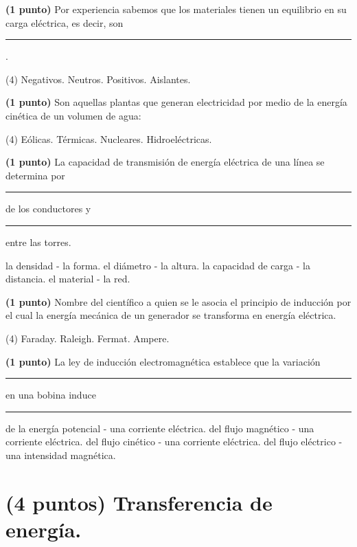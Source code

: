 \documentclass[12pt, letter]{exam}
\begin{document}
\begin{questions}
    \question\textbf{(1 punto)} Por experiencia sabemos que los materiales tienen un equilibrio en su carga eléctrica, es decir, son \rule{2cm}{0.1mm}.
    \begin{tasks}(4)
        \task Negativos.
        \task Neutros.
        \task Positivos.
        \task Aislantes.
    \end{tasks}
    \question\textbf{(1 punto)} Son aquellas plantas que generan electricidad por medio de la energía cinética de un volumen de agua:
    \begin{tasks}(4)
        \task Eólicas.
        \task Térmicas.
        \task Nucleares.
        \task Hidroeléctricas.
    \end{tasks}
    \question\textbf{(1 punto)} La capacidad de transmisión de energía eléctrica de una línea se determina por \rule{2cm}{0.1mm} de los conductores y \rule{2cm}{0.1mm} entre las torres.
    \begin{multicols}{2}
    \begin{tasks}
        \task la densidad - la forma.
        \task el diámetro - la altura.
        \task la capacidad de carga - la distancia.
        \task el material - la red.
    \end{tasks}
    \end{multicols}
    \question\textbf{(1 punto)} Nombre del científico a quien se le asocia el principio de inducción por el cual la energía mecánica de un generador se transforma en energía eléctrica.
    \begin{tasks}(4)
        \task Faraday.
        \task Raleigh.
        \task Fermat.
        \task Ampere.
    \end{tasks}
    \question\textbf{(1 punto)} La ley de inducción electromagnética establece que la variación \rule{2cm}{0.1mm} en una bobina induce \rule{2cm}{0.1mm}
    \begin{tasks}
        \task de la energía potencial - una corriente eléctrica.
        \task del flujo magnético - una corriente eléctrica.
        \task del flujo cinético - una corriente eléctrica.
        \task del flujo eléctrico - una intensidad magnética.
    \end{tasks}
    
    \section{(4 puntos) Transferencia de energía.}


\end{questions}
\end{document}
